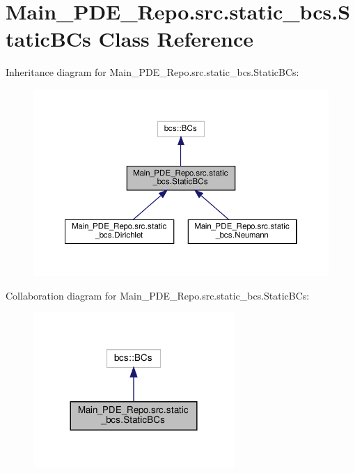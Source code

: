 \hypertarget{classMain__PDE__Repo_1_1src_1_1static__bcs_1_1StaticBCs}{}\section{Main\+\_\+\+P\+D\+E\+\_\+\+Repo.\+src.\+static\+\_\+bcs.\+Static\+B\+Cs Class Reference}
\label{classMain__PDE__Repo_1_1src_1_1static__bcs_1_1StaticBCs}


Inheritance diagram for Main\+\_\+\+P\+D\+E\+\_\+\+Repo.\+src.\+static\+\_\+bcs.\+Static\+B\+Cs\+:
\nopagebreak
\begin{figure}[H]
\begin{center}
\leavevmode
\includegraphics[width=350pt]{classMain__PDE__Repo_1_1src_1_1static__bcs_1_1StaticBCs__inherit__graph}
\end{center}
\end{figure}


Collaboration diagram for Main\+\_\+\+P\+D\+E\+\_\+\+Repo.\+src.\+static\+\_\+bcs.\+Static\+B\+Cs\+:
\nopagebreak
\begin{figure}[H]
\begin{center}
\leavevmode
\includegraphics[width=216pt]{classMain__PDE__Repo_1_1src_1_1static__bcs_1_1StaticBCs__coll__graph}
\end{center}
\end{figure}
